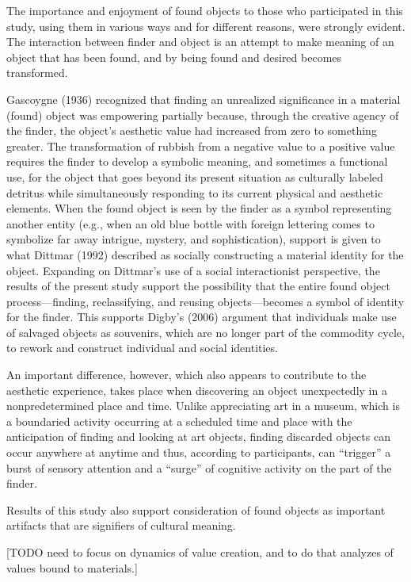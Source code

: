 \documentclass[12pt]{article}
\begin{document}
The importance and enjoyment of found objects to those who participated in this study, using them in various ways and for different reasons, were strongly evident. The interaction between finder and object is an attempt to make meaning of an object that has been found, and by being found and desired becomes transformed.

Gascoygne (1936) recognized that finding an unrealized significance in a material (found) object was empowering partially because, through the creative agency of the finder, the object’s aesthetic value had increased from zero to something greater. The transformation of rubbish from a negative value to a positive value requires the finder to develop a symbolic meaning, and sometimes a functional use, for the object that goes beyond its present situation as culturally labeled detritus while simultaneously responding to its current physical and aesthetic elements. When the found object is seen by the finder as a symbol representing another entity (e.g., when an old blue bottle with foreign lettering comes to symbolize far away intrigue, mystery, and sophistication), support is given to what Dittmar (1992) described as socially constructing a material identity for the object. Expanding on Dittmar’s use of a social interactionist perspective, the results of the present study support the possibility that the entire found object process---finding, reclassifying, and reusing objects---becomes a symbol of identity for the finder. This supports Digby’s (2006) argument that individuals make use of salvaged objects as souvenirs, which are no longer part of the commodity cycle, to rework and construct individual and social identities.

An important difference, however, which also appears to contribute to the aesthetic experience, takes place when discovering an object unexpectedly in a nonpredetermined place and time. Unlike appreciating art in a museum, which is a boundaried activity occurring at a scheduled time and place with the anticipation of finding and looking at art objects, finding discarded objects can occur anywhere at anytime and thus, according to participants, can “trigger” a burst of sensory attention and a “surge” of cognitive activity on the part of the finder. 

Results of this study also support consideration of found objects as important artifacts that are signifiers of cultural meaning.

[TODO need to focus on dynamics of value creation, and to do that analyzes of values bound to materials.]
\end{document}
